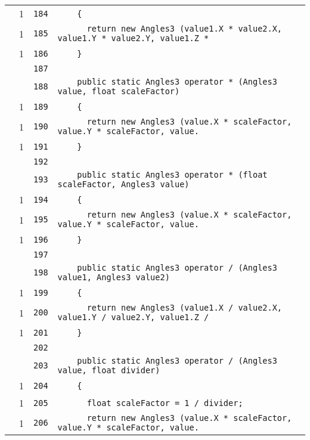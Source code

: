 \documentclass[a4paper,10pt]{article}
\begin{document}
\begin{longtable}[l]{lrrl}
\cellcolor{green} & 1 & \verb~184~ & \verb~    {~\\
\cellcolor{green} & 1 & \verb~185~ & \verb~      return new Angles3 (value1.X * value2.X, value1.Y * value2.Y, value1.Z *~\\
\cellcolor{green} & 1 & \verb~186~ & \verb~    }~\\
\cellcolor{gray} &  & \verb~187~ & \verb~~\\
\cellcolor{gray} &  & \verb~188~ & \verb~    public static Angles3 operator * (Angles3 value, float scaleFactor)~\\
\cellcolor{green} & 1 & \verb~189~ & \verb~    {~\\
\cellcolor{green} & 1 & \verb~190~ & \verb~      return new Angles3 (value.X * scaleFactor, value.Y * scaleFactor, value.~\\
\cellcolor{green} & 1 & \verb~191~ & \verb~    }~\\
\cellcolor{gray} &  & \verb~192~ & \verb~~\\
\cellcolor{gray} &  & \verb~193~ & \verb~    public static Angles3 operator * (float scaleFactor, Angles3 value)~\\
\cellcolor{green} & 1 & \verb~194~ & \verb~    {~\\
\cellcolor{green} & 1 & \verb~195~ & \verb~      return new Angles3 (value.X * scaleFactor, value.Y * scaleFactor, value.~\\
\cellcolor{green} & 1 & \verb~196~ & \verb~    }~\\
\cellcolor{gray} &  & \verb~197~ & \verb~~\\
\cellcolor{gray} &  & \verb~198~ & \verb~    public static Angles3 operator / (Angles3 value1, Angles3 value2)~\\
\cellcolor{green} & 1 & \verb~199~ & \verb~    {~\\
\cellcolor{green} & 1 & \verb~200~ & \verb~      return new Angles3 (value1.X / value2.X, value1.Y / value2.Y, value1.Z /~\\
\cellcolor{green} & 1 & \verb~201~ & \verb~    }~\\
\cellcolor{gray} &  & \verb~202~ & \verb~~\\
\cellcolor{gray} &  & \verb~203~ & \verb~    public static Angles3 operator / (Angles3 value, float divider)~\\
\cellcolor{green} & 1 & \verb~204~ & \verb~    {~\\
\cellcolor{green} & 1 & \verb~205~ & \verb~      float scaleFactor = 1 / divider;~\\
\cellcolor{green} & 1 & \verb~206~ & \verb~      return new Angles3 (value.X * scaleFactor, value.Y * scaleFactor, value.~\\

\end{longtable}
\end{document}
